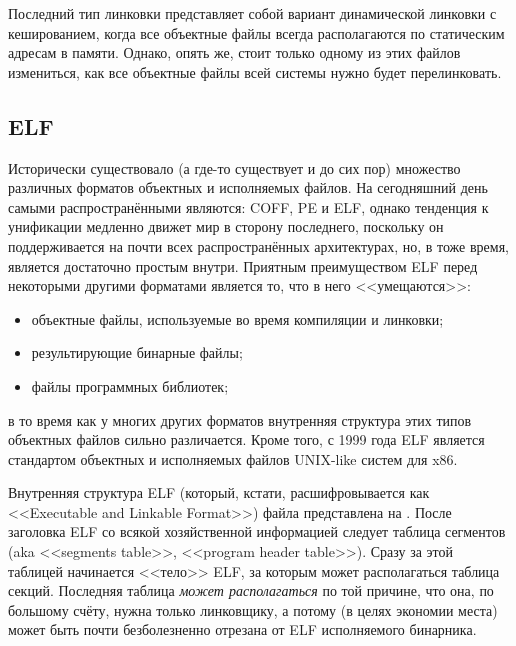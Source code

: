 Последний тип линковки представляет собой вариант динамической линковки с кешированием, когда все объектные файлы всегда располагаются по статическим адресам в памяти. Однако, опять же, стоит только одному из этих файлов измениться, как все объектные файлы всей системы нужно будет перелинковать.

\subsection{ELF}
Исторически существовало (а где-то существует и до сих пор) множество различных форматов объектных и исполняемых файлов.
На сегодняшний день самыми распространёнными являются: COFF, PE и ELF, однако тенденция к унификации медленно движет мир в сторону последнего, поскольку он поддерживается на почти всех распространённых архитектурах, но, в тоже время, является достаточно простым внутри.
Приятным преимуществом ELF перед некоторыми другими форматами является то, что в него <<умещаются>>:
\begin{itemize}
    \item объектные файлы, используемые во время компиляции и линковки;
    \item результирующие бинарные файлы;
    \item файлы программных библиотек;
\end{itemize}
в то время как у многих других форматов внутренняя структура этих типов объектных файлов сильно различается.
Кроме того, с 1999 года ELF является стандартом объектных и исполняемых файлов UNIX-like систем для x86.

Внутренняя структура ELF (который, кстати, расшифровывается как <<Executable and Linkable Format>>) файла представлена на .
После заголовка ELF со всякой хозяйственной информацией следует таблица сегментов (aka <<segments table>>, <<program header table>>).
Сразу за этой таблицей начинается <<тело>> ELF, за которым может располагаться таблица секций.
Последняя таблица \emph{может располагаться} по той причине, что она, по большому счёту, нужна только линковщику, а потому (в целях экономии места) может быть почти безболезненно отрезана от ELF исполняемого бинарника.

